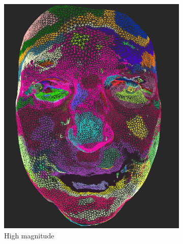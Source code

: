\begin{figure}[h]
    \begin{subfigure}{0.4\textwidth}
	\includegraphics[width=\textwidth]{./img/meshdiff-high_magnitude.PNG}
	\caption{High magnitude}
	\label{fig:meshdiff-high_magnitude}
	\end{subfigure}
    \qquad
    \begin{subfigure}{0.4\textwidth}

\end{subfigure}
\end{figure}
